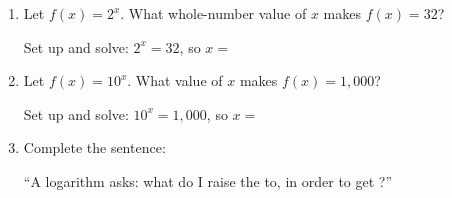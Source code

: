 \documentclass[10pt]{article}
\begin{document}
\namedateperiod

\vspace{0.16in}

\begin{enumerate}[itemsep=22pt]

\item Let $f(x) = 2^x$. What whole-number value of $x$ makes $f(x) = 32$?

      Set up and solve: $2^x = 32$, so $x = $ 

\item Let $f(x) = 10^x$. What value of $x$ makes $f(x) = 1{,}000$?

      Set up and solve: $10^x = 1{,}000$, so $x = $ 

\item Complete the sentence:

      \medskip
      ``A logarithm asks: what  do I raise the  to,
      in order to get ?''

\end{enumerate}
\end{document}
